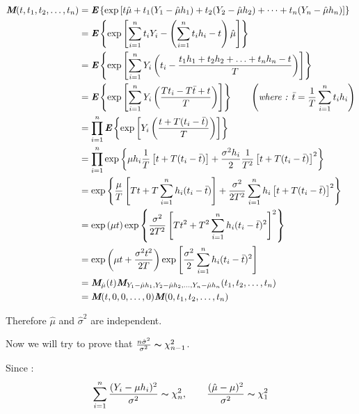 \begin{equation}
\begin{aligned}
\textbf{\em M}(t, t_1, t_2, \ldots, t_n) & = \textbf{\em E}\left\{\exp\left[t\hat{\mu} + t_1(Y_1-\hat{\mu}h_1) + t_2(Y_2-\hat{\mu}h_2) + \cdots + t_n(Y_n-\hat{\mu}h_n)\right]\right\} \\
																		 & = \textbf{\em E}\left\{\exp\left[\sum_{i=1}^nt_iY_i - \left(\sum_{i=1}^nt_ih_i - t\right)\hat{\mu}\right]\right\} \\
																		 & = \textbf{\em E}\left\{\exp\left[\sum_{i=1}^nY_i\left(t_i - \frac{t_1h_1 + t_2h_2 + \ldots + t_nh_n - t}{T}\right)\right]\right\} \\
																		 & = \textbf{\em E}\left\{\exp\left[\sum_{i=1}^nY_i\left(\frac{Tt_i - T\bar{t} + t}{T}\right)\right]\right\} 
																							\qquad \left(\textit{where : }\bar{t} = \frac{1}{T}\sum_{i=1}^nt_ih_i\right)  \\
																		 & = \prod_{i=1}^n\textbf{\em E}\left\{\exp\left[Y_i\left(\frac{t + T(t_i - \bar{t}) }{T}\right)\right]\right\} \\
																		 & = \prod_{i=1}^n\exp\left\{\mu h_i\frac{1}{T}\left[t + T(t_i -\bar{t})\right] + \frac{\sigma^2 h_i}{2}\frac{1}{T^2}\left[t + T(t_i -\bar{t})\right]^2\right\} \\
																		 & = \exp\left\{\frac{\mu}{T}\left[Tt + T\sum_{i=1}^nh_i(t_i -\bar{t})\right] + \frac{\sigma^2}{2T^2}\sum_{i=1}^nh_i\left[t + T(t_i -\bar{t})\right]^2\right\} \\
																		 & = \exp\left(\mu t\right)\exp\left\{\frac{\sigma^2}{2T^2}\left[Tt^2 + T^2\sum_{i=1}^nh_i(t_i -\bar{t})^2\right]^2\right\} \\
																		 & = \exp\left(\mu t + \frac{\sigma^2t^2}{2T}\right)\exp\left[\frac{\sigma^2}{2}\sum_{i=1}^nh_i(t_i -\bar{t})^2\right] \\
																		 & = \textbf{\em M}_{\hat{\mu}}(t)\textbf{\em M}_{Y_1-\hat{\mu}h_1, Y_2-\hat{\mu}h_2, \ldots, Y_n-\hat{\mu}h_n}(t_1, t_2, \ldots, t_n) \\
																		 & = \textbf{\em M}(t, 0, 0, \ldots,0)\textbf{\em M}(0, t_1, t_2, \ldots, t_n)
\end{aligned}
\end{equation}

Therefore $\hat{\mu}$ and $\hat{\sigma}^2$ are independent.

Now we will try to prove that $\frac{n\hat{\sigma}^2}{\sigma^2} \thicksim \chi_{n-1}^2$.

Since :
\begin{equation}
\sum_{i=1}^n\frac{(Y_i - \mu h_i)^2}{\sigma^2} \thicksim \chi_{n}^2, \qquad \frac{(\hat{\mu} - \mu)^2}{\sigma^2} \thicksim \chi_{1}^2
\end{equation}

